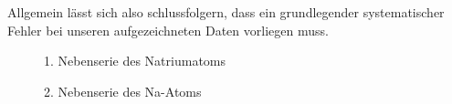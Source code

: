 \documentclass{article}
\begin{document}
Allgemein lässt sich also schlussfolgern, dass ein grundlegender systematischer Fehler bei unseren aufgezeichneten Daten vorliegen muss.

\newpage

\begin{figure}[!p]
    \centering
    \caption{1. Nebenserie des Natriumatoms}
    \label{fig:1NS}
\end{figure}

\begin{figure}[!p]
    \centering
    \caption{2. Nebenserie des Na-Atoms}
    \label{fig:2NS}
\end{figure}

\clearpage
\newpage
\end{document}
